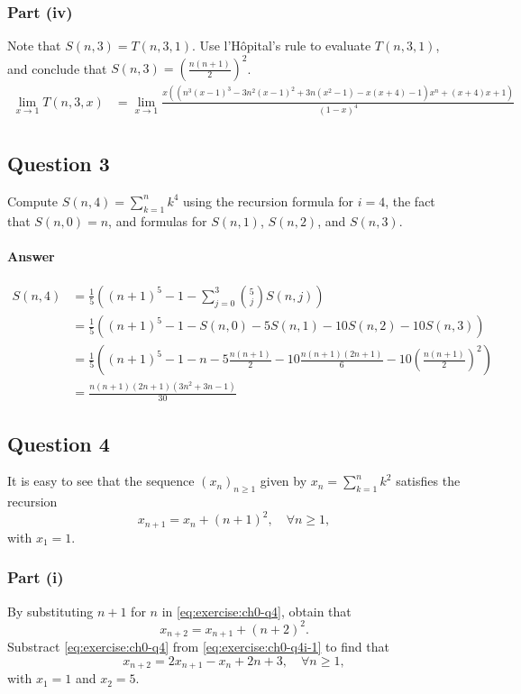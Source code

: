 \subsubsection{Part (iv)}
Note that $ S(n,3) = T(n,3,1) $.
Use l'H\^{o}pital's rule to evaluate $ T(n,3,1) $, and conclude that $ S(n,3) = \left( \frac{n(n+1)}{2} \right)^2 $.
\begin{align*}
    \lim_{x \rightarrow 1} T(n, 3, x) &= \lim_{x \rightarrow 1} \frac{x((n^3 (x - 1)^3 - 3 n^2 (x - 1)^2 + 3 n (x^2 - 1) - x (x + 4) - 1) x^n + (x + 4) x + 1)}{(1 - x)^4} \\
\end{align*}

\subsection{Question 3}
Compute $ S(n, 4) = \sum_{k=1}^{n} k^4 $ using the recursion formula for $ i = 4 $, the fact that $ S(n, 0) = n $, and formulas for $ S(n, 1) $, $ S(n, 2) $, and $ S(n, 3) $.

\paragraph{Answer}
\begin{align*}
    S(n, 4) &= \frac{1}{5} \left( (n + 1)^5 - 1 - \sum_{j=0}^{3} \binom{5}{j} S(n, j) \right) \\
            &= \frac{1}{5} \left( (n + 1)^5 - 1 - S(n, 0) - 5 S(n, 1) - 10 S(n, 2) - 10 S(n, 3) \right) \\
            &= \frac{1}{5} \left( (n + 1)^5 - 1 - n - 5 \frac{n (n + 1)}{2} - 10 \frac{n (n + 1)(2 n + 1)}{6} - 10 \left( \frac{n (n + 1)}{2} \right)^2 \right) \\
            &= \frac{n (n + 1)(2 n + 1)(3 n^2 + 3 n - 1)}{30}
\end{align*}

\subsection{Question 4}
It is easy to see that the sequence $ (x_n)_{n \geq 1} $ given by $ x_n = \sum_{k=1}^{n} k^2 $ satisfies the recursion
\begin{equation}
    x_{n + 1} = x_n + (n + 1)^2, \quad \forall n \geq 1,
    \label{eq:exercise:ch0-q4}
\end{equation}
with $ x_1 = 1 $.

\subsubsection{Part (i)}
By substituting $ n + 1 $ for $ n $ in \eqref{eq:exercise:ch0-q4}, obtain that
\begin{equation}
    x_{n + 2} = x_{n + 1} + (n + 2)^2.
    \label{eq:exercise:ch0-q4i-1}
\end{equation}
Substract \eqref{eq:exercise:ch0-q4} from \eqref{eq:exercise:ch0-q4i-1} to find that
\begin{equation}
    x_{n + 2} = 2 x_{n + 1} - x_n + 2 n + 3, \quad \forall n \geq 1,
    \label{eq:exercise:ch0-q4i-2}
\end{equation}
with $ x_1 = 1 $ and $ x_2 = 5 $.

